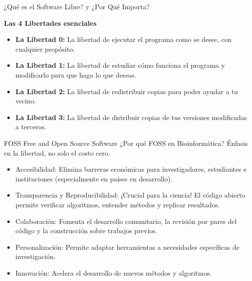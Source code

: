 \documentclass[11pt]{beamer}
\begin{document}

	\begin{frame}{¿Qué es el Software Libre? y ¿Por Qué Importa?}

		\textbf{Las 4 Libertades esenciales} 
		
		\begin{itemize}
		\item \textbf{La Libertad 0:} La libertad de ejecutar el programa como se desee, con cualquier propósito.
		\item \textbf{La Libertad 1:} La libertad de estudiar cómo funciona el programa y modificarlo para que haga lo que deseas.
		\item \textbf{La Libertad 2:} La libertad de redistribuir copias para poder ayudar a tu vecino.
		\item \textbf{La Libertad 3:} La libertad de distribuir copias de tus versiones modificadas a terceros.
		\end{itemize}
	\end{frame}
	
	
	\begin{frame}{FOSS Free and Open Source Software ¿Por qué FOSS en Bioinformática?}	
 Énfasis en la libertad, no solo el costo cero.
        \begin{itemize}        
		\item Accesibilidad: Elimina barreras económicas para investigadores, estudiantes e instituciones (especialmente en países en desarrollo).
		\item Transparencia y Reproducibilidad: ¡Crucial para la ciencia! El código abierto permite verificar algoritmos, entender métodos y replicar resultados.
		\item Colaboración: Fomenta el desarrollo comunitario, la revisión por pares del código y la construcción sobre trabajos previos.
		\item Personalización: Permite adaptar herramientas a necesidades específicas de investigación.
		\item Innovación: Acelera el desarrollo de nuevos métodos y algoritmos.
		\end{itemize}
	\end{frame}
	
	
\end{document}
